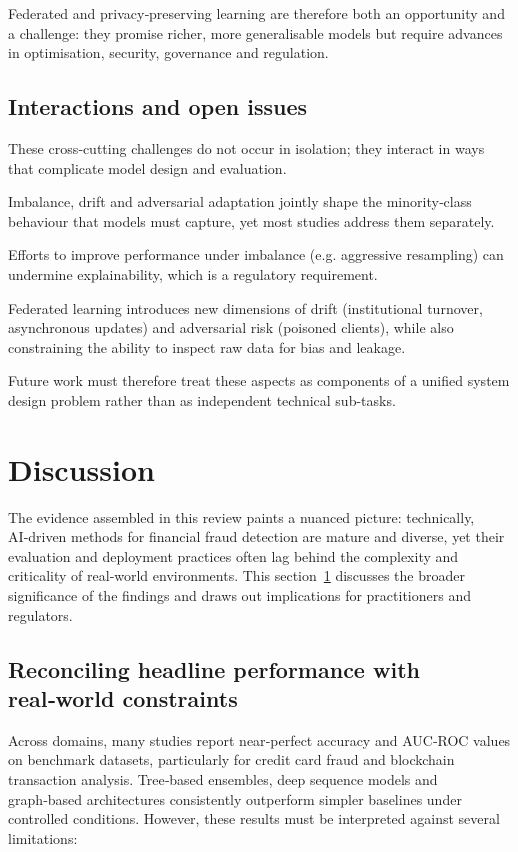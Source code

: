 \documentclass[a4paper,fleqn]{cas-dc}
\begin{document}
Federated and privacy‑preserving learning are therefore both an opportunity and a challenge: they promise richer, more generalisable models but require advances in optimisation, security, governance and regulation.

\subsection{Interactions and open issues}
These cross‑cutting challenges do not occur in isolation; they interact in ways that complicate model design and evaluation.

Imbalance, drift and adversarial adaptation jointly shape the minority‑class behaviour that models must capture, yet most studies address them separately.

Efforts to improve performance under imbalance (e.g. aggressive resampling) can undermine explainability, which is a regulatory requirement.

Federated learning introduces new dimensions of drift (institutional turnover, asynchronous updates) and adversarial risk (poisoned clients), while also constraining the ability to inspect raw data for bias and leakage.

Future work must therefore treat these aspects as components of a unified system design problem rather than as independent technical sub-tasks.

\section{Discussion}
\label{sec:discussion}
The evidence assembled in this review paints a nuanced picture: 
technically, AI‑driven methods for financial fraud detection are mature and diverse, yet their evaluation and deployment practices often lag behind the complexity and criticality of real‑world environments. 
This section~\ref{sec:discussion} discusses the broader significance of the findings and draws out implications for practitioners and regulators.

\subsection{Reconciling headline performance with real‑world constraints}

Across domains, many studies report near‑perfect accuracy and AUC‑ROC values on benchmark datasets, particularly for credit card fraud and blockchain transaction analysis. 
Tree‑based ensembles, deep sequence models and graph‑based architectures consistently outperform simpler baselines under controlled conditions. 
However, these results must be interpreted against several limitations:
\end{document}
